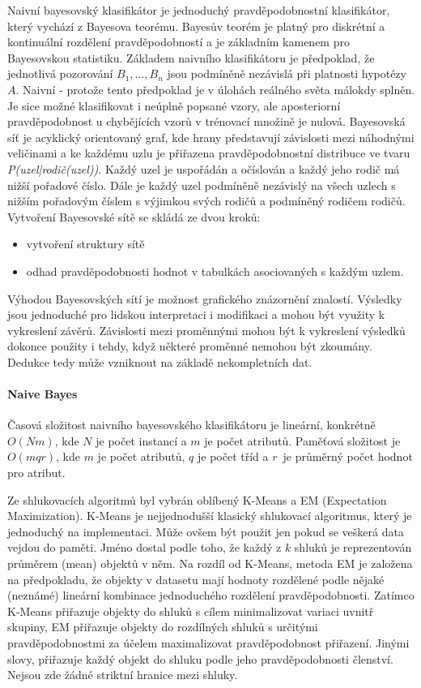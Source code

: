 \documentclass[12pt]{article}
\begin{document}
Naivní bayesovský klasifikátor je jednoduchý pravděpodobnostní klasifikátor, který vychází z Bayesova teorému. Bayesův teorém je platný pro diskrétní a kontinuální rozdělení pravděpodobností a je základním kamenem pro Bayesovskou statistiku. \citep{tuffery}
\newline
\indent
Základem naivního klasifikátoru je předpoklad, že jednotlivá pozorování $B_1, ..., B_n$ jsou podmíněně nezávislá při platnosti hypotézy $A$. Naivní - protože tento předpoklad je v úlohách reálného světa málokdy splněn. Je sice možné klasifikovat i neúplně popsané vzory, ale aposteriorní pravděpodobnost u chybějících vzorů v trénovací množině je nulová. 
\newline
\indent
Bayesovská síť je acyklický orientovaný graf, kde hrany představují závislosti mezi náhodnými veličinami a ke každému uzlu je přiřazena pravděpodobnostní distribuce ve tvaru \textit{P(uzel|rodič(uzel))}. Každý uzel je uspořádán a očíslován a každý jeho rodič má nižší pořadové číslo. Dále je každý uzel podmíněně nezávislý na všech uzlech s nižším pořadovým číslem s výjimkou svých rodičů a podmíněný rodičem rodičů. Vytvoření Bayesovské sítě se skládá ze dvou kroků:
\begin{itemize}
\item vytvoření struktury sítě
\item odhad pravděpodobnosti hodnot v tabulkách asociovaných s každým uzlem.
\end{itemize}
Výhodou Bayesovských sítí je možnost grafického znázornění znalostí. Výsledky jsou jednoduché pro lidskou interpretaci i modifikaci a mohou být využity k vykreslení závěrů. Závislosti mezi proměnnými mohou být
k vykreslení výsledků dokonce použity i tehdy, když některé proměnné nemohou být zkoumány. Dedukce tedy může vzniknout na základě nekompletních dat. \citep{tan}
\paragraph{Naive Bayes}
Časová složitost naivního bayesovského klasifikátoru je lineární, konkrétně $O(Nm)$, kde $N$ je počet instancí a $m$ je počet atributů. Paměťová složitost je $O(mqr)$, kde $m$ je počet atributů, $q$ je počet tříd a $r$~je průměrný počet hodnot pro atribut. \citep{chris}

Ze shlukovacích algoritmů byl vybrán oblíbený K-Means a EM (Expectation Maximization). K-Means je nejjednodušší klasický shlukovací algoritmus, který je jednoduchý na implementaci. Může ovšem být použit jen pokud se veškerá data vejdou do paměti. Jméno dostal podle toho, že každý z $k$ shluků je reprezentován průměrem (mean) objektů v něm.
\newline
\indent
Na rozdíl od K-Means, metoda EM je založena na předpokladu, že objekty v datasetu mají hodnoty rozdělené podle nějaké (neznámé) lineární kombinace jednoduchého rozdělení pravděpodobnosti. Zatímco K-Means přiřazuje objekty do shluků s cílem minimalizovat variaci uvnitř skupiny, EM přiřazuje objekty do rozdílných shluků s určitými pravděpodobnostmi za účelem maximalizovat pravděpodobnost přiřazení. Jinými slovy, přiřazuje každý objekt do shluku podle jeho pravděpodobnosti členství. Nejsou zde žádné striktní hranice mezi shluky. \citep{uddin}
\end{document}
